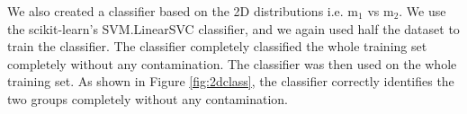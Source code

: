 We also created a classifier based on the 2D distributions i.e. m$_1$ vs m$_2$. We use the scikit-learn's SVM.LinearSVC classifier, and we again used half the dataset to train the classifier. The classifier completely classified the whole training set completely without any contamination. The classifier was then used on the whole training set. As shown in Figure \ref{fig:2dclass}, the classifier correctly identifies the two groups completely without any contamination.
